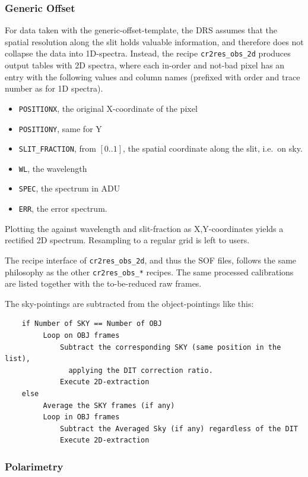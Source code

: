 \subsubsection{Generic Offset}

For data taken with the generic-offset-template, the DRS assumes that the
spatial resolution along the slit holds valuable information, and therefore does
not collapse the data into 1D-spectra. Instead, the recipe \verb!cr2res_obs_2d!
produces output tables with 2D spectra, where each in-order and not-bad pixel
has an entry with the following values and column names (prefixed with order and
trace number as for 1D spectra).

\begin{itemize}
    \item \verb!POSITIONX!, the original X-coordinate of the pixel
    \item \verb!POSITIONY!, same for Y
    \item \verb!SLIT_FRACTION!, from $[0..1]$, the spatial coordinate along the slit, i.e.~on sky.
    \item \verb!WL!, the wavelength
    \item \verb!SPEC!, the spectrum in ADU
    \item \verb!ERR!, the error spectrum.
\end{itemize}

Plotting the against wavelength and slit-fraction as X,Y-coordinates yields a
rectified 2D spectrum. Resampling to a regular grid is left to users.


The recipe interface of \verb!cr2res_obs_2d!, and thus the SOF files, follows
the same philosophy as the other \verb!cr2res_obs_*! recipes. The same processed
calibrations are listed together with the to-be-reduced raw frames.


The sky-pointings are subtracted from the object-pointings like this:

\begin{verbatim}
    if Number of SKY == Number of OBJ
         Loop on OBJ frames
             Subtract the corresponding SKY (same position in the list),
               applying the DIT correction ratio.
             Execute 2D-extraction
    else
         Average the SKY frames (if any)
         Loop in OBJ frames
             Subtract the Averaged Sky (if any) regardless of the DIT
             Execute 2D-extraction
\end{verbatim}         

\subsubsection{Polarimetry}

